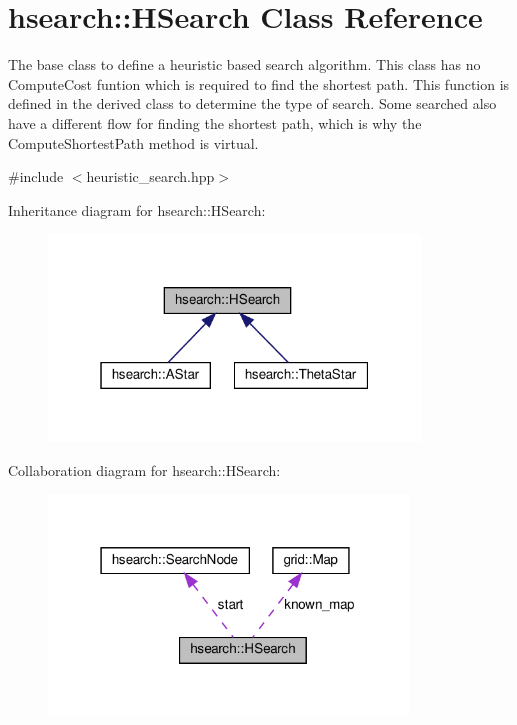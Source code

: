 \hypertarget{classhsearch_1_1HSearch}{}\section{hsearch\+:\+:H\+Search Class Reference}
\label{classhsearch_1_1HSearch}


The base class to define a heuristic based search algorithm. This class has no Compute\+Cost funtion which is required to find the shortest path. This function is defined in the derived class to determine the type of search. Some searched also have a different flow for finding the shortest path, which is why the Compute\+Shortest\+Path method is virtual.  




{\ttfamily \#include $<$heuristic\+\_\+search.\+hpp$>$}



Inheritance diagram for hsearch\+:\+:H\+Search\+:
\nopagebreak
\begin{figure}[H]
\begin{center}
\leavevmode
\includegraphics[width=280pt]{d3/dff/classhsearch_1_1HSearch__inherit__graph}
\end{center}
\end{figure}


Collaboration diagram for hsearch\+:\+:H\+Search\+:
\nopagebreak
\begin{figure}[H]
\begin{center}
\leavevmode
\includegraphics[width=271pt]{df/d1e/classhsearch_1_1HSearch__coll__graph}
\end{center}
\end{figure}
